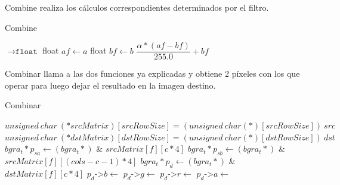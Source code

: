 \par{Combine realiza los cálculos correspondientes determinados por el filtro.}
\begin{algorithm}[h!]
\caption{Combine}
\begin{algorithmic}
    $\to \texttt{float}$
	\State float $af \gets a$
	\State float $bf \gets b$
	\State \Return $\dfrac{\alpha * (af - bf)}{255.0} + bf$
\EndFunction
\end{algorithmic} 
\end{algorithm}

\par{Combinar llama a las dos funciones ya explicadas y obtiene 2 píxeles con los que operar para luego dejar el resultado en la imagen destino.}
\begin{algorithm}[h!]
\caption{Combinar}
\begin{algorithmic}
	\State $unsigned~ char~ (*srcMatrix)[srcRowSize] = (unsigned~ char (*)[srcRowSize])~ src$
	\State $unsigned~ char~ (*dstMatrix)[dstRowSize] = (unsigned~ char (*)[dstRowSize])~ dst$
			\State $bgra_t* p_{sa} \gets (bgra_t*)$ \& $srcMatrix[f][c * 4]$
			\State $bgra_t* p_{sb} \gets (bgra_t*)$ \&$srcMatrix[f][(cols - c -1) * 4]$
			\State $bgra_t *p_d \gets (bgra_t*)$ \&$dstMatrix[f][c * 4]$
			\State $p_d$->$b \gets$ 
			\State $p_d$->$g \gets$ 
			\State $p_d$->$r \gets$ 
			\State $p_d$->$a \gets$ 
		\EndFor
	\EndFor
\EndFunction
\end{algorithmic} 
\end{algorithm}
	
